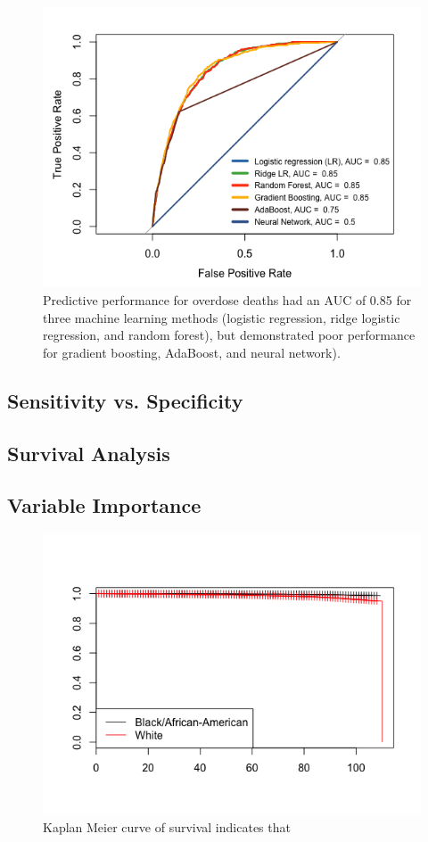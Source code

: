 \documentclass[twoside,10.5pt]{article}
\begin{document}
\begin{figure}[htp]
\centering
\includegraphics[width=12cm]{images/AUC_ML_opioids.png}
\caption{Predictive performance for overdose deaths had an AUC of 0.85 for three machine learning methods (logistic regression, ridge logistic regression, and random forest), but demonstrated poor performance for gradient boosting, AdaBoost, and neural network).}
\label{fig:lion}
\end{figure}

\subsection{Sensitivity vs. Specificity}

\subsection{Survival Analysis}

\subsection{Variable Importance}


\begin{figure}[htp]
\centering
\includegraphics[width=12cm]{images/Race_KaplanMeier.png}
\caption{Kaplan Meier curve of survival indicates that }
\label{fig:lion}
\end{figure}
\end{document}
